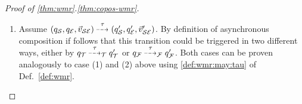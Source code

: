 \begin{proof}[Proof of \ref{thm:wmr}.\ref{thm:copos-wmr}]
\begin{enumerate}
        By definition of asynchronous composition if follows that
        this transition could be triggered in six different ways. Each of the six cases can be proven analogously to case (1), (2), (3.1) ,(3.2) ,(4.1) , and (4.2) above, using \ref{def:wmr:may:a-tgc} of Def.~\ref{def:wmr}.
        \item Assume $(q_\S,q_\E,\vec{v}_{\S\E}) \may{\tau} (q_\S',q_\E',\vec{v}'_{\S\E})$. 
        By definition of asynchronous composition if follows that
        this transition could be triggered in two different ways, either by $q_\T \may{\tau}_\T q'_\T$ or $q_\F \may{\tau}_\F q'_\F$. Both cases can be proven analogously to case (1) and (2) above using \ref{def:wmr:may:tau} of Def.~\ref{def:wmr}. 
    \end{enumerate}
    \end{proof}

